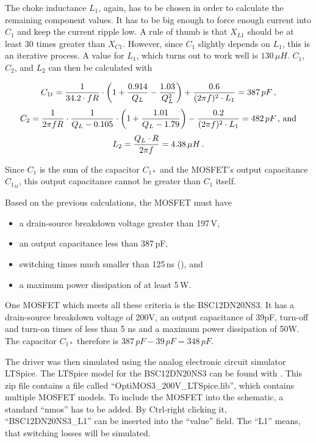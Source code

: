 The choke inductance \(L_1\), again, has to be chosen in order to calculate the remaining component values. It has to be big enough to force enough current into \(C_1\) and keep the current ripple low. A rule of thumb is that \(X_{L1}\) should be at least 30 times greater than \(X_{C1}\). However, since \(C_1\) slightly depends on \(L_1\), this is an iterative process. A value for \(L_1\), which turns out to work well is \(130\,\mu H\). \(C_1\), \(C_2\), and \(L_2\) can then be calculated with

\begin{equation*}
    C_{1t} = \frac{1}{34.2\cdot f R} \cdot \left( 1 + \frac{0.914}{Q_L} - \frac{1.03}{Q_L^2} \right) + \frac{0.6}{(2 \pi f)^2  \cdot L_1} = 387\,pF\textnormal{\,,}
\end{equation*}
\begin{equation*}
    C_2 = \frac{1}{2 \pi  f  R} \cdot \frac{1}{Q_L - 0.105} \cdot \left( 1 + \frac{1.01}{Q_L - 1.79} \right) - \frac{0.2}{(2 \pi f)^2 \cdot L_1} = 482\,pF \textnormal{\,, and}
\end{equation*}
\begin{equation*}
    L_2 = \frac{Q_L \cdot R}{2 \pi f} = 4.38\,\mu H\textnormal{\,.}
\end{equation*}
 
Since \(C_1\) is the sum of the capacitor \(C_{1*}\) and the MOSFET's output capacitance \(C_{1_M}\), %
this output capacitance cannot be greater than \(C_1\) itself.

Based on the previous calculations, the MOSFET must have

\begin{itemize}
    \item a drain-source breakdown voltage greater than 197\,V,
    \item an output capacitance less than 387\,pF,
    \item switching times much smaller than 125\,ns (), and
    \item a maximum power dissipation of at least 5\,W.
\end{itemize}

One MOSFET which meets all these criteria is the BSC12DN20NS3. It has a drain-source breakdown voltage of 200V, an output capacitance of 39pF, turn-off and turn-on times of less than 5 ns and a maximum power dissipation of 50W. The capacitor \(C_{1*}\) therefore is \(387\,pF - 39\,pF = 348\,pF\).

The driver was then simulated using the analog electronic circuit simulator LTSpice. The LTSpice model for the BSC12DN20NS3 can be found with . This zip file contains a file called \enquote{OptiMOS3\_200V\_LTSpice.lib}, which contains multiple MOSFET models. To include the MOSFET into the schematic, a standard \enquote{nmos} has to be added. By Ctrl-right clicking it, \enquote{BSC12DN20NS3\_L1} can be inserted into the \enquote{value} field. The \enquote{L1} means, that switching losses will be simulated.

